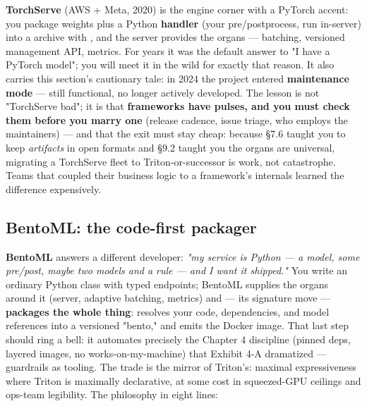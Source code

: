 \textbf{TorchServe} (AWS + Meta, 2020) is the engine corner with a PyTorch accent: you package weights plus a Python \textbf{handler} (your pre/postprocess, run in-server) into a  archive with , and the server provides the organs — batching, versioned management API, metrics. For years it was the default answer to "I have a PyTorch model"; you will meet it in the wild for exactly that reason. It also carries this section's cautionary tale: in 2024 the project entered \textbf{maintenance mode} — still functional, no longer actively developed. The lesson is not "TorchServe bad"; it is that \textbf{frameworks have pulses, and you must check them before you marry one} (release cadence, issue triage, who employs the maintainers) — and that the exit must stay cheap: because §7.6 taught you to keep \textit{artifacts} in open formats and §9.2 taught you the organs are universal, migrating a TorchServe fleet to Triton-or-successor is work, not catastrophe. Teams that coupled their business logic to a framework's internals learned the difference expensively.

\subsection*{BentoML: the code-first packager}

\textbf{BentoML} answers a different developer: \textit{"my service is Python — a model, some pre/post, maybe two models and a rule — and I want it shipped."} You write an ordinary Python class with typed endpoints; BentoML supplies the organs around it (server, adaptive batching, metrics) and — its signature move — \textbf{packages the whole thing}:  resolves your code, dependencies, and model references into a versioned "bento," and  emits the Docker image. That last step should ring a bell: it automates precisely the Chapter 4 discipline (pinned deps, layered images, no works-on-my-machine) that Exhibit 4-A dramatized — guardrails as tooling. The trade is the mirror of Triton's: maximal expressiveness where Triton is maximally declarative, at some cost in squeezed-GPU ceilings and ops-team legibility. The philosophy in eight lines:

